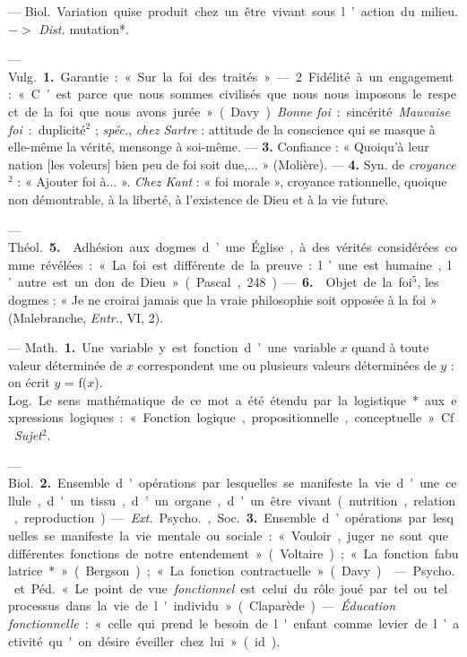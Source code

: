 \begin{itemize}[leftmargin=1cm, label=, itemsep=1pt]
 — \si{Biol.} Variation quise produit chez un être vivant
sous l’action du milieu. $->$ {\it Dist.} mutation*.

 — \si{Vulg.} {\bf 1.} Garantie : « Sur la
foi des traités ». — 2 Fidélité à un
engagement : « C’est parce que nous sommes civilisés que nous nous
imposons le respect de la foi que nous avons jurée » (Davy). {\it Bonne
foi} : sincérité. {\it Mauvaise foi} : duplicité$^2$ ; {\it spéc.},
{\it chez Sartre} : attitude de la conscience qui se masque à elle-même la
vérité, mensonge à soi-même. — {\bf 3.} Confiance : « Quoiqu’à leur nation
[les voleurs] bien peu de foi soit due,... » (Molière).
— {\bf 4.} Syn. de {\it croyance}$^2$ : « Ajouter foi à... ». {\it Chez
Kant} : « foi morale », croyance rationnelle, quoique non
démontrable, à la liberté, à l’existence de Dieu et à la vie future.

— \si{Théol.} {\bf 5.}  Adhésion aux
dogmes d’une Église, à des vérités considérées comme révélées : « La
foi est différente de la preuve : l’une est humaine, l’autre est un don de
Dieu » (Pascal, 248). — {\bf 6.}  Objet
de la foi$^5$, les dogmes : « Je ne croirai jamais que la vraie philosophie
soit opposée à la foi » (Malebranche, {\it Entr.}, VI, 2).

 — \si{Math.} {\bf 1.} Une variable
y est fonction d’une variable $x$ quand
à toute valeur déterminée de $x$ correspondent une ou plusieurs valeurs
déterminées de $y$ : on écrit $y$ = f($x$).
\si{Log.} Le sens mathématique de ce mot a été étendu par la logistique*
aux expressions logiques : « Fonction logique, propositionnelle, conceptuelle. » Cf. {\it Sujet}$^2$.

— \si{Biol.} {\bf 2.} Ensemble d'opérations
par lesquelles se manifeste la vie
d'une cellule, d'un tissu, d’un organe, d’un être vivant (nutrition,
relation, reproduction). — {\it Ext.}
\si{Psycho.}, \si{Soc.} {\bf 3.} Ensemble d’opérations par lesquelles se
manifeste la vie mentale ou sociale : « Vouloir,
juger ne sont que différentes fonctions de notre entendement » (Voltaire); « La fonction fabulatrice* »
(Bergson) ; « La fonction contractuelle » (Davy).

 — \si{Psycho.} et \si{Péd.} « Le
point de vue {\it fonctionnel} est celui du rôle joué par tel ou tel processus
dans la vie de l'individu » (Claparède). — {\it Éducation fonctionnelle} :
« celle qui prend le besoin de l'enfant comme levier de l’activité qu'on
désire éveiller chez lui » (id.).


\end{itemize}
